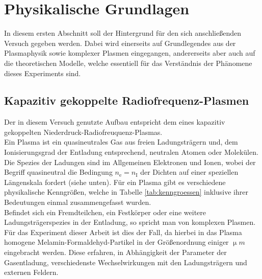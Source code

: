 \documentclass[numbers=noenddot,a4paper,notitlepage,twoside,BCOR15mm]{scrbook}
\newcommand{\ix}[1]{_\text{#1}}
\begin{document}
	\chapter{Physikalische Grundlagen}\label{sec:physg}

		In diesem ersten Abschnitt soll der Hintergrund f\"ur den sich anschlie{\ss}enden Versuch gegeben werden. Dabei wird einerseits auf Grundlegendes aus der Plasmaphysik sowie komplexer Plasmen eingegangen, andererseits aber auch auf die theoretischen Modelle, welche essentiell f\"ur das Verst\"andnis der Ph\"anomene dieses Experiments sind.

		\section{Kapazitiv gekoppelte Radiofrequenz-Plasmen} \label{sub:kaprfplasm}

			Der in diesem Versuch genutzte Aufbau entspricht dem eines kapazitiv gekoppelten Niederdruck-Radiofreuquenz-Plasmas.\\
			Ein Plasma ist ein quasineutrales Gas aus freien Ladungsträgern und, dem Ionisierungsgrad der Entladung entsprechend, neutralen Atomen oder Molekülen. Die Spezies der Ladungen sind im Allgemeinen Elektronen und Ionen, wobei der Begriff quasineutral die Bedingung $n\ix{e}=n\ix{I}$ der Dichten auf einer speziellen Längenskala fordert (siehe unten). Für ein Plasma gibt es verschiedene physikalische Kenngrößen, welche in Tabelle \ref{tab:kenngroessen} inklusive ihrer Bedeutungen einmal zusammengefasst wurden.\\
			Befindet sich ein Fremdteilchen, ein Festkörper oder eine weitere Ladungsträgerspezies in der Entladung, so spricht man von komplexen Plasmen. Für das Experiment dieser Arbeit ist dies der Fall, da hierbei in das Plasma homogene Melamin-Formaldehyd-Partikel in der Größenordnung einiger $\unit{\upmu m}$ eingebracht werden. Diese erfahren, in Abhängigkeit der Parameter der Gasentladung, verschiedenste Wechselwirkungen mit den Ladungsträgern und externen Feldern.
\end{document}
